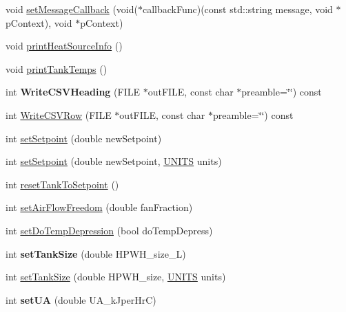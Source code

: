 \begin{DoxyCompactItemize}
\item 
void \hyperlink{class_h_p_w_h_af20440c49f36a44b66b82d16b0b6a74b}{set\-Message\-Callback} (void($\ast$callback\-Func)(const std\-::string message, void $\ast$p\-Context), void $\ast$p\-Context)
\item 
void \hyperlink{class_h_p_w_h_a49d923bea7be1ad1ee60c02163bbf6cc}{print\-Heat\-Source\-Info} ()
\item 
void \hyperlink{class_h_p_w_h_a59d5b765bf4490be7bd5954a5ab7324e}{print\-Tank\-Temps} ()
\item 
\hypertarget{class_h_p_w_h_ac8bced7dc05598df491f907cd895ccaa}{int {\bfseries Write\-C\-S\-V\-Heading} (F\-I\-L\-E $\ast$out\-F\-I\-L\-E, const char $\ast$preamble=\char`\"{}\char`\"{}) const }\label{class_h_p_w_h_ac8bced7dc05598df491f907cd895ccaa}

\item 
int \hyperlink{class_h_p_w_h_a5652291d663296decd912fe92fb9d4e7}{Write\-C\-S\-V\-Row} (F\-I\-L\-E $\ast$out\-F\-I\-L\-E, const char $\ast$preamble=\char`\"{}\char`\"{}) const 
\item 
int \hyperlink{class_h_p_w_h_adb49b5846f9056602de57cb289e0a321}{set\-Setpoint} (double new\-Setpoint)
\item 
int \hyperlink{class_h_p_w_h_ab7d91fead271ef907cf13450055cdb06}{set\-Setpoint} (double new\-Setpoint, \hyperlink{class_h_p_w_h_a145320dbf116b9245ac4421026cff294}{U\-N\-I\-T\-S} units)
\item 
int \hyperlink{class_h_p_w_h_aac5af7347053c06dcbc446b44fa3686d}{reset\-Tank\-To\-Setpoint} ()
\item 
int \hyperlink{class_h_p_w_h_ae9c7561968c17d6b0bb28d17cc7b700f}{set\-Air\-Flow\-Freedom} (double fan\-Fraction)
\item 
int \hyperlink{class_h_p_w_h_a4fcbecc80f393cabf73609ef97c3e56b}{set\-Do\-Temp\-Depression} (bool do\-Temp\-Depress)
\item 
\hypertarget{class_h_p_w_h_acc2635e0073fee9bdf050eaec8e73d9c}{int {\bfseries set\-Tank\-Size} (double H\-P\-W\-H\-\_\-size\-\_\-\-L)}\label{class_h_p_w_h_acc2635e0073fee9bdf050eaec8e73d9c}

\item 
int \hyperlink{class_h_p_w_h_a48eb98ee5cef78dc29fbeaba57c37b2d}{set\-Tank\-Size} (double H\-P\-W\-H\-\_\-size, \hyperlink{class_h_p_w_h_a145320dbf116b9245ac4421026cff294}{U\-N\-I\-T\-S} units)
\item 
\hypertarget{class_h_p_w_h_a1c26c0b3879d5378cb3ec372adabb9a3}{int {\bfseries set\-U\-A} (double U\-A\-\_\-k\-Jper\-Hr\-C)}\label{class_h_p_w_h_a1c26c0b3879d5378cb3ec372adabb9a3}


\end{DoxyCompactItemize}
